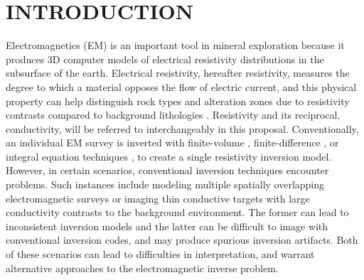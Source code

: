 \documentclass[letterpaper,11pt]{article}
\title{\normalsize}
\begin{document}

\newpage

\tableofcontents
\newpage

\section{INTRODUCTION}

Electromagnetics (EM) is an important tool in mineral exploration because it produces 3D computer models of electrical resistivity distributions in the subsurface of the earth. Electrical resistivity, hereafter resistivity, measures the degree to which a material opposes the flow of electric current, and this physical property can help distinguish rock types and alteration zones due to resistivity contrasts compared to background lithologies \cite[]{Keller1988}.  Resistivity and its reciprocal, conductivity, will be referred to interchangeably in this proposal. Conventionally, an individual EM survey is inverted with finite-volume \cite[]{Haber2007}, finite-difference \cite[]{Commer2004}, or integral equation techniques \cite[]{Cox2010}, to create a single resistivity inversion model. However, in certain scenarios, conventional inversion techniques encounter problems.  Such instances include modeling multiple spatially overlapping electromagnetic surveys or imaging thin conductive targets with large conductivity contrasts to the background environment. The former can lead to inconsistent inversion models and the latter can be difficult to image with conventional inversion codes, and may produce spurious inversion artifacts.  Both of these scenarios can lead to difficulties in interpretation, and warrant alternative approaches to the electromagnetic inverse problem.  
\end{document}

